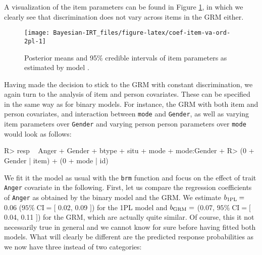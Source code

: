 \documentclass[jss]{jss}
\begin{document}
A visualization of the item parameters can be found in Figure
\ref{fig:coef-item-va-ord-2pl}, in which we clearly see that
discrimination does not vary across items in the GRM either.

\begin{CodeChunk}
\begin{figure}

{\centering \texttt{[image: Bayesian-IRT\_files/figure-latex/coef-item-va-ord-2pl-1]} 

}

\caption[Posterior means and 95\% credible intervals of item parameters as estimated by model ]{Posterior means and 95\% credible intervals of item parameters as estimated by model .}\label{fig:coef-item-va-ord-2pl}
\end{figure}
\end{CodeChunk}

Having made the decision to stick to the GRM with constant
discrimination, we again turn to the analysis of item and person
covariates. These can be specified in the same way as for binary models.
For instance, the GRM with both item and person covariates, and
interaction between \texttt{mode} and \texttt{Gender}, as well as
varying item parameters over \texttt{Gender} and varying person person
parameters over \texttt{mode} would look as follows:

\begin{CodeChunk}

\begin{CodeInput}
R> resp ~ Anger + Gender + btype + situ + mode + mode:Gender +
R>   (0 + Gender | item) + (0 + mode | id)
\end{CodeInput}
\end{CodeChunk}

We fit it the model as usual with the \texttt{brm} function and focus on
the effect of trait \texttt{Anger} covariate in the following. First,
let us compare the regression coefficients of \texttt{Anger} as obtained
by the binary model and the GRM. We estimate \(b_{\rm 1PL} =\) 0.06
(\(95\% \; \text{CI} = [\) 0.02, 0.09 \(]\)) for the 1PL model and
\(b_{\rm GRM} =\) (0.07, \(95\% \; \text{CI} = [\) 0.04, 0.11 \(]\)) for
the GRM, which are actually quite similar. Of course, this it not
necessarily true in general and we cannot know for sure before having
fitted both models. What will clearly be different are the predicted
response probabilities as we now have three instead of two categories:
\end{document}
